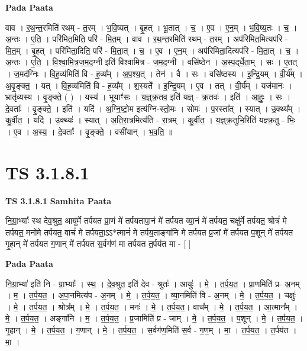 \documentclass[17pt]{extarticle}
\begin{document}
\textbf{Pada Paata} \newline

वाव । र॒थ॒न्त॒रमिति॑ रथम् - त॒रम् । भ॒वि॒ष्यत् । बृ॒हत् । भू॒तात् । च॒ । ए॒व । ए॒न॒म् । भ॒वि॒ष्य॒तः । च॒ । अ॒न्तः । ए॒ति॒ । परि॑मित॒मिति॒ परि॑ - मि॒त॒म् । वाव । र॒थ॒न्त॒रमिति॑ रथम् - त॒रम् । अप॑रिमित॒मित्यप॑रि - मि॒त॒म् । बृ॒हत् । परि॑मिता॒दिति॒ परि॑ - मि॒ता॒त् । च॒ । ए॒व । ए॒न॒म् । अप॑रिमिता॒दित्यप॑रि - मि॒ता॒त् । च॒ । अ॒न्तः । ए॒ति॒ । वि॒श्वा॒मि॒त्र॒ज॒म॒द॒ग्नी इति॑ विश्वामित्र - ज॒म॒द॒ग्नी । वसि॑ष्ठेन । अ॒स्प॒द्‌र्धे॒ता॒म् । सः । ए॒तत् । ज॒मद॑ग्निः । वि॒ह॒व्य॑मिति॑ वि - ह॒व्य᳚म् । अ॒प॒श्य॒त् । तेन॑ । वै । सः । वसि॑ष्ठस्य । इ॒न्द्रि॒यम् । वी॒र्य᳚म् । अ॒वृ॒ङ्क्त॒ । यत् । वि॒ह॒व्य॑मिति॑ वि - ह॒व्य᳚म् । श॒स्यते᳚ । इ॒न्द्रि॒यम् । ए॒व । तत् । वी॒र्य᳚म् । यज॑मानः । भ्रातृ॑व्यस्य । वृ॒ङ्क्ते॒ ( ) । यस्य॑ । भूयाꣳ॑सः । य॒ज्ञ्॒क्र॒तव॒ इति॑ यज्ञ् - क्र॒तवः॑ । इति॑ । आ॒हुः॒ । सः । दे॒वताः᳚ । वृ॒ङ्क्ते॒ । इति॑ । यदि॑ । अ॒ग्नि॒ष्टो॒म इत्य॑ग्नि-स्तो॒मः । सोमः॑ । प॒रस्ता᳚त् । स्यात् । उ॒क्थ्य᳚म् । कु॒र्वी॒त॒ । यदि॑ । उ॒क्थ्यः॑ । स्यात् । अ॒ति॒रा॒त्रमित्य॑ति - रा॒त्रम् । कु॒र्वी॒त॒ । य॒ज्ञ्॒क्र॒तुभि॒रिति॑ यज्ञ्क्र॒तु - भिः॒ । ए॒व । अ॒स्य॒ । दे॒वताः᳚ । वृ॒ङ्क्ते॒ । वसी॑यान् । भ॒व॒ति॒ ॥  \newline





\section{ TS 3.1.8.1 }

\textbf{TS 3.1.8.1 } \newline
\textbf{Samhita Paata} \newline

नि॒ग्रा॒भ्याः᳚ स्थ देव॒श्रुत॒ आयु॑र्मे तर्पयत प्रा॒णं मे॑ तर्पयतापा॒नं मे॑ तर्पयत व्या॒नं मे॑ तर्पयत॒ चक्षु॑र्मे तर्पयत॒ श्रोत्रं॑ मे तर्पयत॒ मनो॑मे तर्पयत॒ वाचं॑ मे तर्पयता॒ऽऽ*त्मानं॑ मे तर्पय॒ताङ्गा॑नि मे तर्पयत प्र॒जां मे॑ तर्पयत प॒शून् मे॑ तर्पयत गृ॒हान् मे॑ तर्पयत ग॒णान् मे॑ तर्पयत स॒र्वग॑णं मा तर्पयत त॒र्पय॑त मा - [  ] \newline

\textbf{Pada Paata} \newline

नि॒ग्रा॒भ्या॑ इति॑ नि - ग्रा॒भ्याः᳚ । स्थ॒ । दे॒व॒श्रुत॒ इति॑ देव - श्रुतः॑ । आयुः॑ । मे॒ । त॒र्प॒य॒त॒ । प्रा॒णमिति॑ प्र- अ॒नम् । म॒ । त॒र्प॒य॒त॒ । अ॒पा॒नमित्य॑प - अ॒नम् । मे॒ । त॒र्प॒य॒त॒ । व्या॒नमिति॑ वि - अ॒नम् । मे॒ । त॒र्प॒य॒त॒ । चक्षुः॑ । मे॒ । त॒र्प॒य॒त॒ । श्रोत्र᳚म् । मे॒ । त॒र्प॒य॒त॒ । मनः॑ । मे॒ । त॒र्प॒य॒त॒। वाच᳚म् । मे॒ । त॒र्प॒य॒त॒ । आ॒त्मान᳚म् । मे॒ । त॒र्प॒य॒त॒ । अङ्गा॑नि । म॒ । त॒र्प॒य॒त॒ । प्र॒जामिति॑ प्र - जाम् । मे॒ । त॒र्प॒य॒त॒ । प॒शून् । मे॒ । त॒र्प॒य॒त॒ । गृ॒हान् । मे॒ । त॒र्प॒य॒त॒ । ग॒णान् । मे॒ । त॒र्प॒य॒त॒ । स॒र्वग॑ण॒मिति॑ स॒र्व - ग॒ण॒म् । मा॒ । त॒र्प॒य॒त॒ । त॒र्पय॑त । मा॒ ।  \newline
\end{document}
